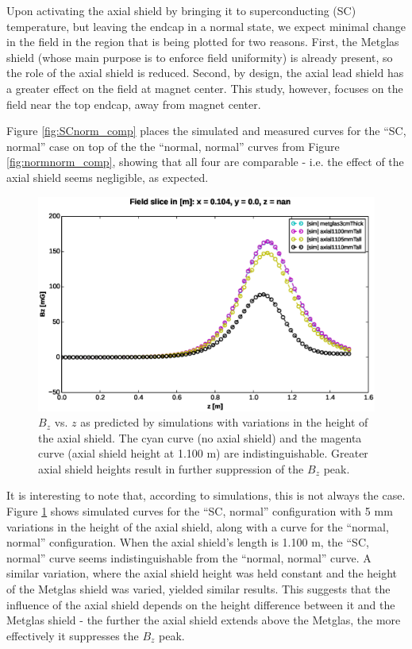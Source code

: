 \documentclass[twocolumn,aps,prb,citeautoscript]{revtex4-1}
\begin{document}

Upon activating the axial shield by bringing it to superconducting (SC) temperature,
but leaving the endcap in a normal state, we expect minimal change in the field in the region that is being
plotted for two reasons. First, the Metglas shield (whose main purpose is to enforce field uniformity) is already
present, so the role of the axial shield is reduced. Second, by design, the axial lead shield has a greater effect on
the field at magnet center. This study, however, focuses on the field near the top endcap, away from magnet center.

Figure \ref{fig:SCnorm_comp}
places the simulated and measured curves for the ``SC, normal'' case on top of the the ``normal, normal'' curves
from Figure \ref{fig:normnorm_comp}, showing that all four are comparable - i.e. the effect of the axial shield
seems negligible, as expected.

\begin{figure}
    \includegraphics[width=\textwidth]{figures/axial_effect.eps}
    \caption{\label{fig:SCnorm_hd}$B_z$ vs. $z$ as predicted by simulations with variations in the height
    of the axial shield. The cyan curve (no axial shield) and the magenta curve (axial shield height at
    1.100 m) are indistinguishable. Greater axial shield heights result in further suppression of the
    $B_z$ peak.}
\end{figure}

It is interesting to note that, according to simulations, this is not always the case. Figure \ref{fig:SCnorm_hd}
shows simulated curves for the ``SC, normal'' configuration with 5 mm variations in the height of the axial shield,
along with a curve for the ``normal, normal'' configuration. When the axial shield's length is 1.100 m, the
``SC, normal'' curve seems indistinguishable from the ``normal, normal'' curve.
A similar variation, where the axial shield height was held constant and the height of the Metglas shield was varied,
yielded similar results. This suggests that the influence of the axial shield depends on the
height difference between it and the Metglas shield - the further the axial shield extends above the Metglas,
the more effectively it suppresses the $B_z$ peak.
\end{document}
